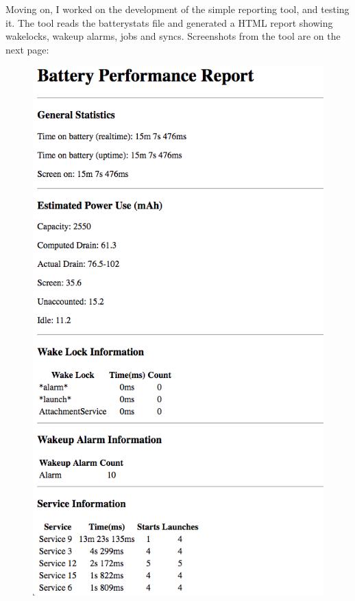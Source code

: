 \documentclass[a4paper,12pt]{article}
\begin{document}
Moving on, I worked on the development of the simple reporting tool, and testing it. The tool reads the batterystats file and generated a HTML report showing wakelocks, wakeup alarms, jobs and syncs. Screenshots from the tool are on the next page:
\pagebreak
\begin{figure}[!h]
 	\begin{center}
		\includegraphics[scale=0.6]{reporter1}
	\end{center}
\end{figure}
\end{document}
